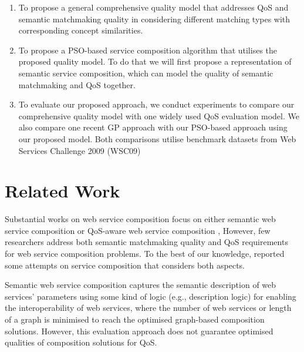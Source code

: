 \documentclass{llncs}
\begin{document}
\begin{enumerate}
 \item To propose a general comprehensive quality model that addresses QoS and semantic matchmaking quality in considering different matching types with corresponding concept similarities.
  
 \item To propose a PSO-based service composition algorithm that utilises the proposed quality model. To do that we will first propose a representation of semantic service composition, which can model the quality of semantic matchmaking and QoS together.
  
 \item To evaluate our proposed approach, we conduct experiments to compare our comprehensive quality model with one widely used QoS evaluation model. We also compare one recent GP approach \cite{ma2015hybrid} with our PSO-based approach using our proposed model. Both comparisons utilise benchmark datasets from Web Services Challenge 2009 (WSC09) \cite{kona2009wsc} 
  
\end{enumerate}

\section{Related Work} \label{relatedWork}
Substantial works on web service composition focus on either semantic web service composition \cite{boustil2014semantic,bansal2016generalized,mier2015integrated} or QoS-aware web service composition \cite{gupta2015optimization,qi2010combining,ma2015hybrid,da2016particle,da2015graphevol,yu2013adaptive}, However, few researchers address both semantic matchmaking quality and QoS requirements for web service composition problems. To the best of our knowledge, \cite{fanjiang2014semantic,lecue2009optimizing,pop2009immune} reported some attempts on service composition that considers both aspects.

Semantic web service composition \cite{boustil2014semantic,bansal2016generalized,mier2015integrated} captures the semantic description of web services' parameters using some kind of logic (e.g., description logic) for enabling the interoperability of web services, where the number of web services or length of a graph is minimised to reach the optimised graph-based composition solutions. However, this evaluation approach does not guarantee optimised qualities of composition solutions for QoS.
\end{document}
